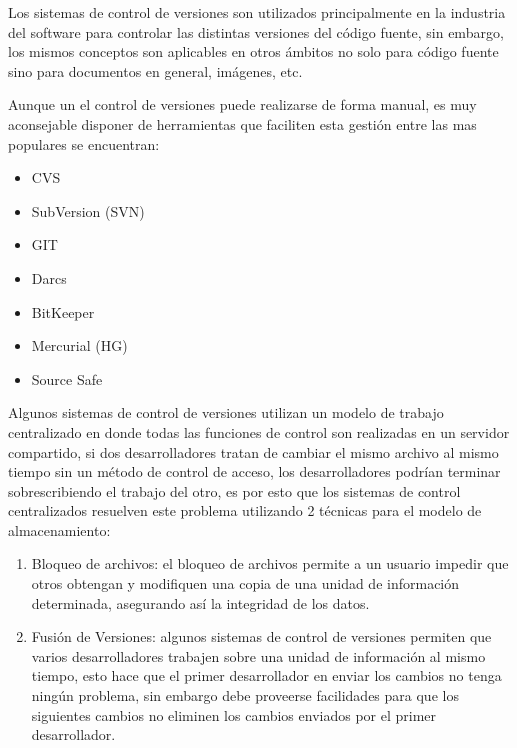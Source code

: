 Los sistemas de control de versiones son utilizados principalmente en la industria del software para controlar las distintas versiones del código fuente, sin embargo, los mismos conceptos son aplicables en otros ámbitos no solo para código fuente sino para documentos en general, imágenes, etc.

Aunque un el control de versiones puede realizarse de forma manual, es muy aconsejable disponer de herramientas que faciliten esta gestión entre las mas populares se encuentran:

\begin{itemize}

	\item CVS \cite{cvs}
	\item SubVersion (SVN) \cite{svn}
	\item GIT \cite{git}
	\item Darcs \cite{darcs}
	\item BitKeeper \cite{bitkeeper}
	\item Mercurial (HG) \cite{mercurial}
	\item Source Safe \cite{ssafe}

\end{itemize}


Algunos sistemas de control de versiones utilizan un modelo de trabajo centralizado en donde todas las funciones de control son realizadas en un servidor compartido, si dos desarrolladores tratan de cambiar el mismo archivo al mismo tiempo sin un método de control de acceso, los desarrolladores podrían terminar sobrescribiendo el trabajo del otro, es por esto que los sistemas de control centralizados resuelven este problema utilizando 2 técnicas para el modelo de almacenamiento:

\begin{enumerate}

	\item Bloqueo de archivos: el bloqueo de archivos permite a un usuario impedir que otros obtengan y modifiquen una copia de una unidad de información determinada, asegurando así la integridad de los datos.
	
	\item Fusión de Versiones: algunos sistemas de control de versiones permiten que varios desarrolladores trabajen sobre una unidad de información al mismo tiempo, esto hace que el primer desarrollador en enviar los cambios no tenga ningún problema, sin embargo debe proveerse facilidades para que los siguientes cambios no eliminen los cambios enviados por el primer desarrollador.

\end{enumerate}

